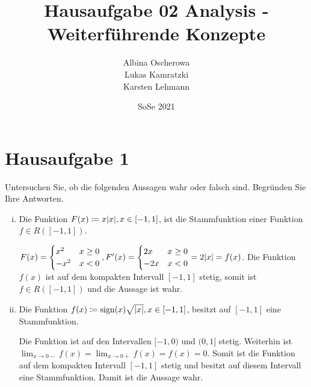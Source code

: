 \documentclass{article}
\author{Albina Oscherowa \\ Lukas Kamratzki \\ Karsten Lehmann}
\date{SoSe 2021}
\title{Hausaufgabe 02 Analysis - Weiterführende Konzepte}
\begin{document}
\section*{Hausaufgabe 1}

Untersuchen Sie, ob die folgenden Aussagen wahr oder falsch sind.
Begründen Sie Ihre Antworten.

\begin{enumerate}[(i)]
\item Die Funktion $F(x) \coloneqq x\abs{x}, x \in [-1,1]$, ist die Stammfunktion einer
  Funktion $f \in R([-1, 1])$.

  \label{dia:1.1}

  $F(x) = \begin{cases}
    x^2 & x \geq 0 \\
    - x^2 & x < 0 \\
  \end{cases}, F'(x) = \begin{cases}
    2x & x \geq 0 \\
    -2x & x < 0 \\
  \end{cases} = 2 \abs{x} = f(x)$.
  Die Funktion $f(x)$ ist auf dem kompakten Intervall $[-1, 1]$ stetig, somit ist
  $f \in R([-1, 1])$ und die Aussage ist wahr.
  
\item Die Funktion $f(x) \coloneqq \text{sign}(x) \sqrt{\abs{x}}, x \in [-1,1]$, besitzt
  auf $[-1,1]$ eine Stammfunktion.

  \label{dia:1.2}

  Die Funktion ist auf den Intervallen $[-1, 0)$ und $(0, 1]$ stetig.
  Weiterhin ist $\lim_{x \to 0-} f(x) = \lim_{x \to 0+} f(x) = f(x) = 0$.
  Somit ist die Funktion auf dem kompakten Intervall $[-1, 1]$ stetig und
  besitzt auf diesem Intervall eine Stammfunktion.
  Damit ist die Aussage wahr.


\end{enumerate}
\end{document}
